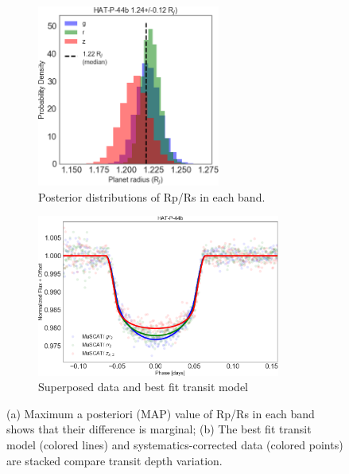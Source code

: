 \begin{figure}
\centering
\begin{subfigure}{.5\textwidth}
	\includegraphics[width=6cm]{hatp44/radius_ratios_Rjup.png}
    \caption{Posterior distributions of Rp/Rs in each band.}
\end{subfigure}%
\begin{subfigure}{.5\textwidth}
	\includegraphics[width=8cm]{hatp44/grz_multi_stacked.png}
    \caption{Superposed data and best fit transit model}
    \label{fig:hatp44_stacked}
\end{subfigure}
\caption{(a) Maximum a posteriori (MAP) value of Rp/Rs in each band shows that their difference is marginal; (b) The best fit transit model (colored lines) and systematics-corrected data (colored points) are stacked compare transit depth variation.}
\label{fig:hatp44_RpRs}
\end{figure}

